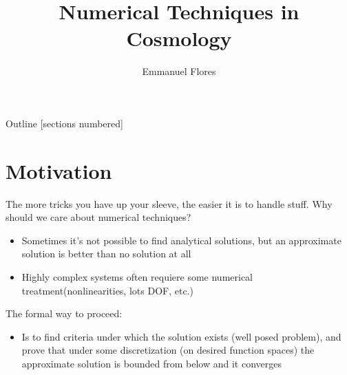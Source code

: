 \documentclass[aspectratio=169, 12pt]{beamer}
\title{Numerical Techniques in Cosmology}
\author{Emmanuel Flores}
\institute{Cosmology Final Presentation, \\Tufts University}
\begin{document}
\maketitle	
\begin{frame}{Outline}
	[sections numbered]
	\tableofcontents[currentsection]
\end{frame}
\section{Motivation}
\begin{frame}{The more tricks you have up your sleeve, the easier it is to handle stuff.}
\pause
Why should we care about numerical techniques? 
\pause
\begin{itemize}
	\item Sometimes it's not possible to find analytical solutions, but \alert{an approximate solution is better than no solution at all}\pause
	\item Highly complex systems often requiere some numerical treatment(\alert{nonlinearities, lots DOF, etc.})\pause
\end{itemize}
The formal way to proceed: \pause
\begin{itemize}
	\item Is to find criteria under which the \alert{solution exists} (well posed problem), and prove that under some discretization (on desired function spaces) the approximate solution is \alert{bounded from below and it converges}
\end{itemize}
\end{frame}
\end{document}
